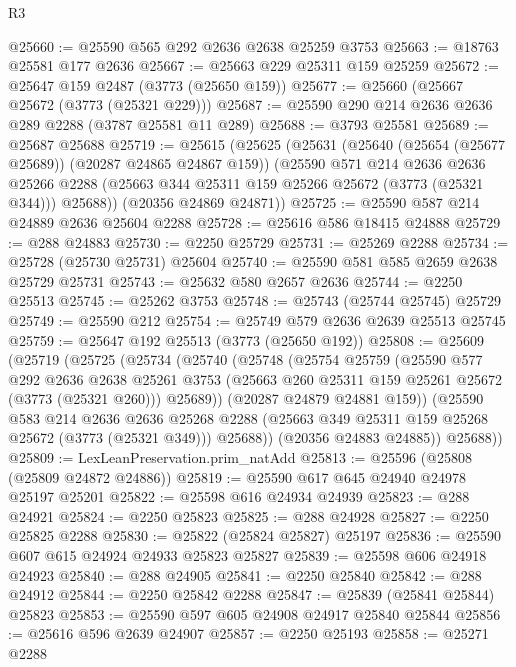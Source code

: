 \begin{lexlean}{R3}
\begin{coremodule}
@25660 := @25590 @565 @292 @2636 @2638 @25259 @3753
@25663 := @18763 @25581 @177 @2636
@25667 := @25663 @229 @25311 @159 @25259
@25672 := @25647 @159 @2487 (@3773 (@25650 @159))
@25677 := @25660 (@25667 @25672 (@3773 (@25321 @229)))
@25687 := @25590 @290 @214 @2636 @2636 @289 @2288 (@3787 @25581 @11 @289)
@25688 := @3793 @25581
@25689 := @25687 @25688
@25719 := @25615
    (@25625
      (@25631
        (@25640 (@25654 (@25677 @25689)) (@20287 @24865 @24867 @159))
        (@25590
          @571
          @214
          @2636
          @2636
          @25266
          @2288
          (@25663 @344 @25311 @159 @25266 @25672 (@3773 (@25321 @344)))
          @25688))
      (@20356 @24869 @24871))
@25725 := @25590 @587 @214 @24889 @2636 @25604 @2288
@25728 := @25616 @586 @18415 @24888
@25729 := @288 @24883
@25730 := @2250 @25729
@25731 := @25269 @2288
@25734 := @25728 (@25730 @25731) @25604
@25740 := @25590 @581 @585 @2659 @2638 @25729 @25731
@25743 := @25632 @580 @2657 @2636
@25744 := @2250 @25513
@25745 := @25262 @3753
@25748 := @25743 (@25744 @25745) @25729
@25749 := @25590 @212
@25754 := @25749 @579 @2636 @2639 @25513 @25745
@25759 := @25647 @192 @25513 (@3773 (@25650 @192))
@25808 := @25609
    (@25719
      (@25725
        (@25734
          (@25740
            (@25748
              (@25754
                @25759
                (@25590
                  @577
                  @292
                  @2636
                  @2638
                  @25261
                  @3753
                  (@25663 @260 @25311 @159 @25261 @25672 (@3773 (@25321 @260)))
                  @25689))
              (@20287 @24879 @24881 @159))
            (@25590
              @583
              @214
              @2636
              @2636
              @25268
              @2288
              (@25663 @349 @25311 @159 @25268 @25672 (@3773 (@25321 @349)))
              @25688))
          (@20356 @24883 @24885))
        @25688))
@25809 := LexLeanPreservation.prim_natAdd
@25813 := @25596 (@25808 (@25809 @24872 @24886))
@25819 := @25590 @617 @645 @24940 @24978 @25197 @25201
@25822 := @25598 @616 @24934 @24939
@25823 := @288 @24921
@25824 := @2250 @25823
@25825 := @288 @24928
@25827 := @2250 @25825 @2288
@25830 := @25822 (@25824 @25827) @25197
@25836 := @25590 @607 @615 @24924 @24933 @25823 @25827
@25839 := @25598 @606 @24918 @24923
@25840 := @288 @24905
@25841 := @2250 @25840
@25842 := @288 @24912
@25844 := @2250 @25842 @2288
@25847 := @25839 (@25841 @25844) @25823
@25853 := @25590 @597 @605 @24908 @24917 @25840 @25844
@25856 := @25616 @596 @2639 @24907
@25857 := @2250 @25193
@25858 := @25271 @2288

\end{coremodule}
\end{lexlean}
